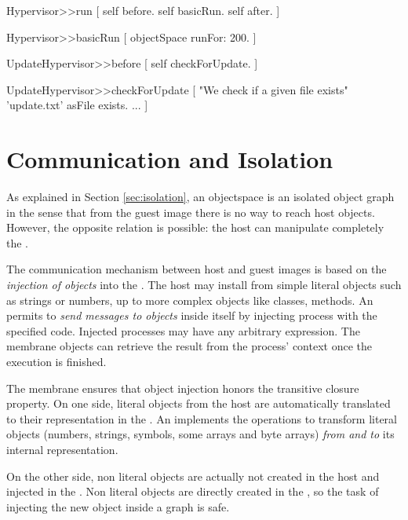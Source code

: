 \begin{code}
Hypervisor>>run [
    self before.
    self basicRun.
    self after.
]

Hypervisor>>basicRun [
    objectSpace runFor: 200.
]

UpdateHypervisor>>before [
    self checkForUpdate.
]

UpdateHypervisor>>checkForUpdate [
    "We check if a given file exists"
    'update.txt' asFile exists.
    ...
]
\end{code}

\section{Communication and Isolation} \label{sec:communication}\label{sec:isolation}


As explained in Section \ref{sec:isolation}, an objectspace is an isolated object graph in the sense that from the guest image there is no way to reach host objects. However, the opposite relation is possible: the host can manipulate completely the \objectspace.

The communication mechanism between host and guest images is based on the \emph{injection of objects} into the \objectspace. The host may install from simple literal objects such as strings or numbers, up to more complex objects like classes, methods. An \objectspace permits to \emph{send messages to objects} inside itself by injecting process with the specified code. Injected processes may have any arbitrary expression. The membrane objects can retrieve the result from the process' context once the execution is finished.

The \objectspace membrane ensures that object injection honors the transitive closure property. On one side, literal objects from the host are automatically translated to their representation in the \objectspace. An \objectspace implements the operations to transform literal objects (numbers, strings, symbols, some arrays and byte arrays) \emph{from and to} its internal representation.

On the other side, non literal objects are actually not created in the host and injected in the \objectspace. Non literal objects are directly created in the \objectspace, so the task of injecting the new object inside a graph is safe.



